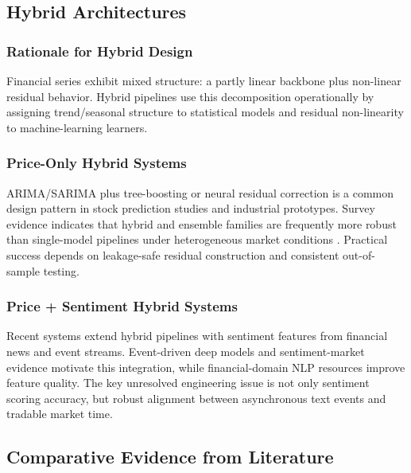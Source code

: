 \documentclass[12pt,a4paper]{article}
\begin{document}
\subsection{Hybrid Architectures}

\subsubsection{Rationale for Hybrid Design}
Financial series exhibit mixed structure: a partly linear backbone plus non-linear residual behavior. Hybrid pipelines use this decomposition operationally by assigning trend/seasonal structure to statistical models and residual non-linearity to machine-learning learners.

\subsubsection{Price-Only Hybrid Systems}
ARIMA/SARIMA plus tree-boosting or neural residual correction is a common design pattern in stock prediction studies and industrial prototypes. Survey evidence indicates that hybrid and ensemble families are frequently more robust than single-model pipelines under heterogeneous market conditions \cite{nti2020review,sezer2020}. Practical success depends on leakage-safe residual construction and consistent out-of-sample testing.

\subsubsection{Price + Sentiment Hybrid Systems}
Recent systems extend hybrid pipelines with sentiment features from financial news and event streams. Event-driven deep models \cite{ding2015} and sentiment-market evidence \cite{bollen2011} motivate this integration, while financial-domain NLP resources \cite{loughran2011,araci2019} improve feature quality. The key unresolved engineering issue is not only sentiment scoring accuracy, but robust alignment between asynchronous text events and tradable market time.

\subsection{Comparative Evidence from Literature}
\end{document}
